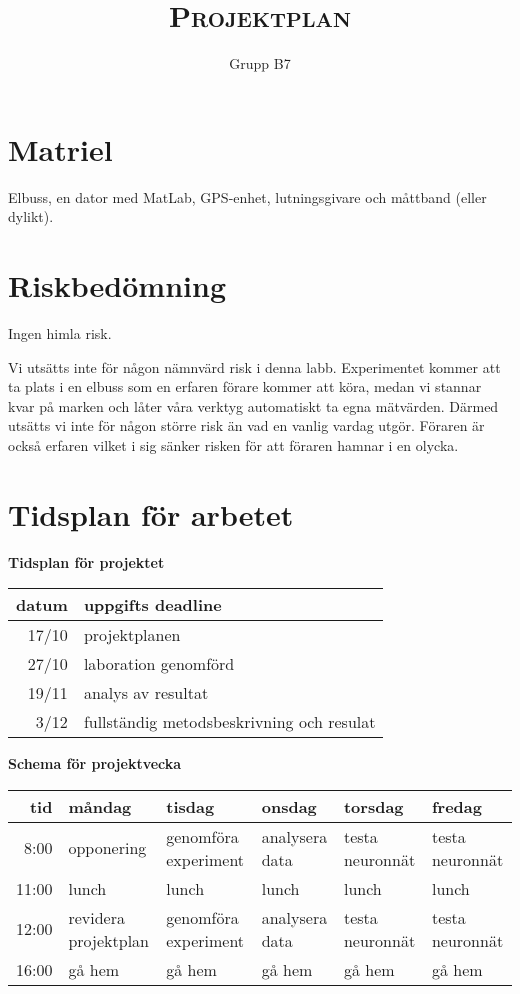 \documentclass[]{article}
\title{{\huge \textsc{Projektplan}}}
\author{Grupp B7}
\begin{document}
\maketitle
{}
\tableofcontents
\cleardoublepage
{}



\section{Matriel}
Elbuss, en dator med MatLab, GPS-enhet, lutningsgivare och
måttband (eller dylikt).



\section{Riskbedömning}
Ingen himla risk.

Vi utsätts inte för någon nämnvärd risk i denna labb.
Experimentet kommer att ta plats i en elbuss som en erfaren förare kommer att köra,
medan vi stannar kvar på marken och låter våra verktyg automatiskt ta egna mätvärden.
Därmed utsätts vi inte för någon större risk än vad en vanlig vardag utgör.
Föraren är också erfaren vilket i sig sänker risken för att föraren hamnar i en olycka.

\section{Tidsplan för arbetet}
\begin{center}
	{\textbf{Tidsplan för projektet}} \par
	\begin{tabular}{r | l}
		datum & uppgifts deadline \\ \hline
		17/10 & projektplanen \\
		27/10 & laboration genomförd \\
		19/11 & analys av resultat \\
		3/12 & fullständig metodsbeskrivning och resulat \\
		\hline
	\end{tabular}

	\vspace{0.75cm}

	{\textbf{Schema för projektvecka}} \par
	\begin{tabular}{r | l l l l l}
		tid & måndag & tisdag & onsdag & torsdag & fredag \\ \hline
		8:00 & opponering & genomföra experiment & analysera data & testa
			neuronnät & testa neuronnät \\
		11:00 & lunch & lunch & lunch & lunch & lunch \\
		12:00 & revidera projektplan & genomföra experiment & analysera data &
			testa neuronnät & testa neuronnät \\
		16:00 & gå hem & gå hem & gå hem & gå hem & gå hem \\
		\hline
	\end{tabular}
\end{center}

\clearpage
\printbibliography
\end{document}
